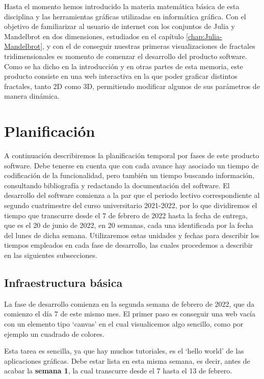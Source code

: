 %
%

Hasta el momento hemos introducido la materia matemática básica de esta disciplina y las herramientas gráficas utilizadas en informática gráfica. Con el objetivo de familiarizar al usuario de internet con los conjuntos de Julia y Mandelbrot en dos dimensiones, estudiados en el capítulo \ref{chap:Julia-Mandelbrot}, y con el de conseguir nuestras primeras visualizaciones de fractales tridimensionales es momento de comenzar el desarrollo del producto software. Como se ha dicho en la introducción y en otras partes de esta memoria, este producto consiste en una web interactiva en la que poder graficar distintos fractales, tanto 2D como 3D, permitiendo modificar algunos de sus parámetros de manera dinámica.  

\section{Planificación}

A continuación describiremos la planificación temporal por fases de este producto software. Debe tenerse en cuenta que con cada avance hay asociado un tiempo de codificación de la funcionalidad, pero también un tiempo buscando información, consultando bibliografía y redactando la documentación del software. El desarrollo del software comienza a la par que el periodo lectivo correspondiente al segundo cuatrimestre del curso universitario 2021-2022, por lo que dividiremos el tiempo que transcurre desde el 7 de febrero de 2022 hasta la fecha de entrega, que es el 20 de junio de 2022, en 20 semanas, cada una identificada por la fecha del lunes de dicha semana. Utilizaremos estas unidades y fechas para describir los tiempos empleados en cada fase de desarrollo, las cuales procedemos a describir en las siguientes subsecciones.

\subsection{Infraestructura básica}

La fase de desarrollo comienza en la segunda semana de febrero de 2022, que da comienzo el día 7 de este mismo mes. El primer paso es conseguir una web vacía con un elemento tipo `canvas' en el cual visualicemos algo sencillo, como por ejemplo un cuadrado de colores.

Esta tarea es sencilla, ya que hay muchos tutoriales, es el `hello world' de las aplicaciones gráficas. Debe estar lista en esta misma semana, es decir, antes de acabar la \textbf{semana 1}, la cual transcurre desde el 7 hasta el 13 de febrero.

